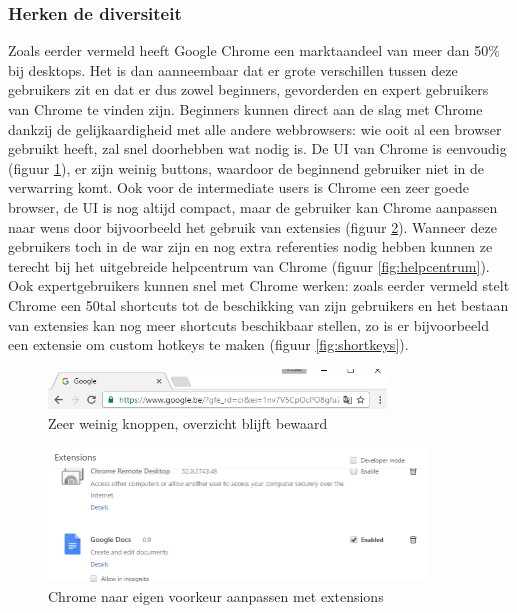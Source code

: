 \documentclass[12pt]{article}
\begin{document}
\subsubsection{Herken de diversiteit}
Zoals eerder vermeld heeft Google Chrome een marktaandeel van meer dan 50\% bij desktops. Het is dan aanneembaar dat er grote verschillen tussen deze gebruikers zit en dat er dus zowel beginners, gevorderden en expert gebruikers van Chrome te vinden zijn. Beginners kunnen direct aan de slag met Chrome dankzij de gelijkaardigheid met alle andere webbrowsers: wie ooit al een browser gebruikt heeft, zal snel doorhebben wat nodig is. De UI van Chrome is eenvoudig (figuur \ref{fig:smallUI}), er zijn weinig buttons, waardoor de beginnend gebruiker niet in de verwarring komt. Ook voor de intermediate users is Chrome een zeer goede browser, de UI is nog altijd compact, maar de gebruiker kan Chrome aanpassen naar wens door bijvoorbeeld het gebruik van extensies (figuur \ref{fig:extensions}). Wanneer deze gebruikers toch in de war zijn en nog extra referenties nodig hebben kunnen ze terecht bij het uitgebreide helpcentrum van Chrome (figuur \ref{fig:helpcentrum}). Ook expertgebruikers kunnen snel met Chrome werken: zoals eerder vermeld stelt Chrome een 50tal shortcuts tot de beschikking van zijn gebruikers en het bestaan van extensies kan nog meer shortcuts beschikbaar stellen, zo is er bijvoorbeeld een extensie om custom hotkeys te maken (figuur \ref{fig:shortkeys}).
\begin{figure}
	\centering
	\includegraphics[width=0.8\textwidth]{smallUI.png}
	\caption{Zeer weinig knoppen, overzicht blijft bewaard}
	\label{fig:smallUI}
\end{figure}
\begin{figure}
	\centering
	\includegraphics[width=0.9\textwidth]{extensions.png}
	\caption{Chrome naar eigen voorkeur aanpassen met extensions}
	\label{fig:extensions}
\end{figure}
\end{document}
